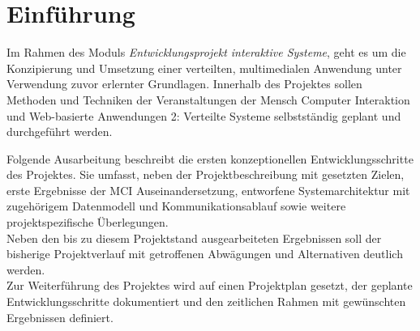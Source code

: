
\chapter{Einführung}
Im Rahmen des Moduls \textit{Entwicklungsprojekt interaktive Systeme}, geht es um die Konzipierung und Umsetzung einer verteilten, multimedialen Anwendung unter Verwendung zuvor erlernter Grundlagen. Innerhalb des Projektes sollen Methoden und Techniken der Veranstaltungen der Mensch Computer Interaktion und Web-basierte Anwendungen 2: Verteilte Systeme selbstständig geplant und durchgeführt werden.

\vspace{0.5cm}

Folgende Ausarbeitung beschreibt die ersten konzeptionellen Entwicklungsschritte des Projektes. Sie umfasst, neben der Projektbeschreibung mit gesetzten Zielen, erste Ergebnisse der MCI Auseinandersetzung, entworfene Systemarchitektur mit zugehörigem Datenmodell und Kommunikationsablauf sowie weitere projektspezifische Überlegungen.\\
Neben den bis zu diesem Projektstand ausgearbeiteten Ergebnissen soll der bisherige Projektverlauf mit getroffenen Abwägungen und Alternativen deutlich werden.\\
Zur Weiterführung des Projektes wird auf einen Projektplan gesetzt, der geplante Entwicklungsschritte dokumentiert und den zeitlichen Rahmen mit gewünschten Ergebnissen definiert.
